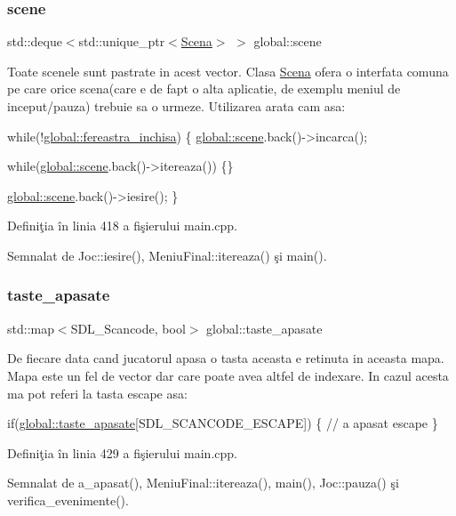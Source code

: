 \mbox{\label{namespaceglobal_af4564594d950b73d4bb81b8c0a4fe029}} 
\subsubsection{\texorpdfstring{scene}{scene}}
{\footnotesize\ttfamily std\+::deque$<$std\+::unique\+\_\+ptr$<$\hyperlink{classScena}{Scena}$>$ $>$ global\+::scene}

Toate scenele sunt pastrate in acest vector. Clasa \hyperlink{classScena}{Scena} ofera o interfata comuna pe care orice scena(care e de fapt o alta aplicatie, de exemplu meniul de inceput/pauza) trebuie sa o urmeze. Utilizarea arata cam asa\+: 
\begin{DoxyCode}
\textcolor{keywordflow}{while}(!\hyperlink{namespaceglobal_a930b1255fa49cd41dc635136822d56ee}{global::fereastra\_inchisa}) \{
    \hyperlink{namespaceglobal_af4564594d950b73d4bb81b8c0a4fe029}{global::scene}.back()->incarca();
    
    \textcolor{keywordflow}{while}(\hyperlink{namespaceglobal_af4564594d950b73d4bb81b8c0a4fe029}{global::scene}.back()->itereaza()) \{\}
    
    \hyperlink{namespaceglobal_af4564594d950b73d4bb81b8c0a4fe029}{global::scene}.back()->iesire();
\}
\end{DoxyCode}
 

Definiţia în linia 418 a fişierului main.\+cpp.



Semnalat de Joc\+::iesire(), Meniu\+Final\+::itereaza() şi main().

\mbox{\label{namespaceglobal_a6da5c1308adb9fdac1c61389b139dc54}} 
\subsubsection{\texorpdfstring{taste\+\_\+apasate}{taste\_apasate}}
{\footnotesize\ttfamily std\+::map$<$S\+D\+L\+\_\+\+Scancode, bool$>$ global\+::taste\+\_\+apasate}

De fiecare data cand jucatorul apasa o tasta aceasta e retinuta in aceasta mapa. Mapa este un fel de vector dar care poate avea altfel de indexare. In cazul acesta ma pot referi la tasta escape asa\+: 
\begin{DoxyCode}
\textcolor{keywordflow}{if}(\hyperlink{namespaceglobal_a6da5c1308adb9fdac1c61389b139dc54}{global::taste\_apasate}[SDL\_SCANCODE\_ESCAPE]) \{
    \textcolor{comment}{// a apasat escape}
\}
\end{DoxyCode}
 

Definiţia în linia 429 a fişierului main.\+cpp.



Semnalat de a\+\_\+apasat(), Meniu\+Final\+::itereaza(), main(), Joc\+::pauza() şi verifica\+\_\+evenimente().

